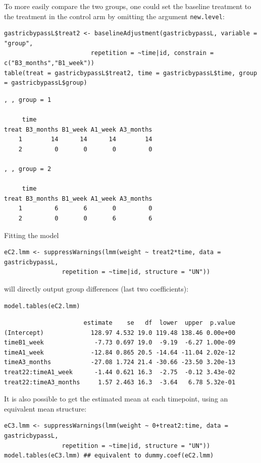 \documentclass[12pt]{article}
\begin{document}
To more easily compare the two groups, one could set the baseline
treatment to the treatment in the control arm by omitting the argument
\texttt{new.level}:
\lstset{language=r,label= ,caption= ,captionpos=b,numbers=none}
\begin{lstlisting}
gastricbypassL$treat2 <- baselineAdjustment(gastricbypassL, variable = "group",
					    repetition = ~time|id, constrain = c("B3_months","B1_week"))
table(treat = gastricbypassL$treat2, time = gastricbypassL$time, group = gastricbypassL$group)
\end{lstlisting}

\begin{verbatim}
, , group = 1

     time
treat B3_months B1_week A1_week A3_months
    1        14      14      14        14
    2         0       0       0         0

, , group = 2

     time
treat B3_months B1_week A1_week A3_months
    1         6       6       0         0
    2         0       0       6         6
\end{verbatim}

Fitting the model
\lstset{language=r,label= ,caption= ,captionpos=b,numbers=none}
\begin{lstlisting}
eC2.lmm <- suppressWarnings(lmm(weight ~ treat2*time, data = gastricbypassL,
				repetition = ~time|id, structure = "UN"))
\end{lstlisting}

will directly output group differences (last two coefficients):
\lstset{language=r,label= ,caption= ,captionpos=b,numbers=none}
\begin{lstlisting}
model.tables(eC2.lmm)
\end{lstlisting}
\begin{verbatim}
                      estimate    se   df  lower  upper  p.value
(Intercept)             128.97 4.532 19.0 119.48 138.46 0.00e+00
timeB1_week              -7.73 0.697 19.0  -9.19  -6.27 1.00e-09
timeA1_week             -12.84 0.865 20.5 -14.64 -11.04 2.02e-12
timeA3_months           -27.08 1.724 21.4 -30.66 -23.50 3.20e-13
treat22:timeA1_week      -1.44 0.621 16.3  -2.75  -0.12 3.43e-02
treat22:timeA3_months     1.57 2.463 16.3  -3.64   6.78 5.32e-01
\end{verbatim}


It is also possible to get the estimated mean at each timepoint, using
an equivalent mean structure:
\lstset{language=r,label= ,caption= ,captionpos=b,numbers=none}
\begin{lstlisting}
eC3.lmm <- suppressWarnings(lmm(weight ~ 0+treat2:time, data = gastricbypassL,
				repetition = ~time|id, structure = "UN"))
model.tables(eC3.lmm) ## equivalent to dummy.coef(eC2.lmm)
\end{lstlisting}
\end{document}
